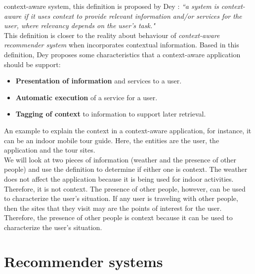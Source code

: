 context-aware system, this definition is proposed by
Dey  \cite{dey2001understanding}: \textit{``a system is context-aware if
it uses context to provide relevant information and/or services for
the user, where relevancy  depends on the user's task."}\\ This
definition is closer  to the reality about behaviour of \textit
{context-aware recommender system} when incorporates contextual
information.
Based in this definition, Dey proposes some characteristics 
that a context-aware application should be support:
\begin{itemize}  
\item \textbf{Presentation of information} and services to a user.
\item \textbf{Automatic execution} of a service for a user.
\item \textbf{Tagging of context} to information to support later retrieval.
\end{itemize} 
An example to explain the context in a context-aware application, for
instance, it can be an indoor mobile tour guide. Here, the entities
are the user, the application and the tour sites. \\We will look at two
pieces of information (weather and the presence of other people) and
use the definition to determine if either one is context. The weather
does not affect the application because it is being used for indoor activities.
Therefore, it is not context. The presence of other people, however,
can be used to characterize the user’s situation. If any user is
traveling with other people, then the sites that they visit may are
the points of interest for the user. Therefore, the presence of other
people is context because it can be used to characterize the user's
situation.

\section{Recommender systems}

